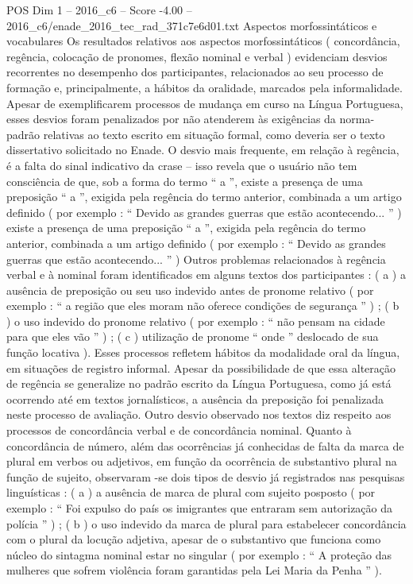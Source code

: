 \begin{textsample}{POS Dim 1 – 2016\_c6 – Score -4.00 – 2016\_c6/enade\_2016\_tec\_rad\_371c7e6d01.txt}
Aspectos morfossintáticos e vocabulares Os resultados relativos aos aspectos morfossintáticos ( concordância, regência, colocação de pronomes, flexão nominal e verbal ) evidenciam desvios recorrentes no desempenho dos participantes, relacionados ao seu processo de formação e, principalmente, a hábitos da oralidade, marcados pela informalidade.
Apesar de exemplificarem processos de mudança em curso na Língua Portuguesa, esses desvios foram penalizados por não atenderem às exigências da norma-padrão relativas ao texto escrito em situação formal, como deveria ser o texto dissertativo solicitado no Enade.
O desvio mais frequente, em relação à regência, é a falta do sinal indicativo da crase – isso revela que o usuário não tem consciência de que, sob a forma do termo “ a ”, existe a presença de uma preposição “ a ”, exigida pela regência do termo anterior, combinada a um artigo definido ( por exemplo : “ Devido as grandes guerras que estão acontecendo... ” ) existe a presença de uma preposição “ a ”, exigida pela regência do termo anterior, combinada a um artigo definido ( por exemplo : “ Devido as grandes guerras que estão acontecendo... ” ) Outros problemas relacionados à regência verbal e à nominal foram identificados em alguns textos dos participantes : ( a ) a ausência de preposição ou seu uso indevido antes de pronome relativo ( por exemplo : “ a região que eles moram não oferece condições de segurança ” ) ; ( b ) o uso indevido do pronome relativo ( por exemplo : “ não pensam na cidade para que eles vão ” ) ; ( c ) utilização de pronome “ onde ” deslocado de sua função locativa ).
Esses processos refletem hábitos da modalidade oral da língua, em situações de registro informal.
Apesar da possibilidade de que essa alteração de regência se generalize no padrão escrito da Língua Portuguesa, como já está ocorrendo até em textos jornalísticos, a ausência da preposição foi penalizada neste processo de avaliação.
Outro desvio observado nos textos diz respeito aos processos de concordância verbal e de concordância nominal.
Quanto à concordância de número, além das ocorrências já conhecidas de falta da marca de plural em verbos ou adjetivos, em função da ocorrência de substantivo plural na função de sujeito, observaram -se dois tipos de desvio já registrados nas pesquisas linguísticas : ( a ) a ausência de marca de plural com sujeito posposto ( por exemplo : “ Foi expulso do país os imigrantes que entraram sem autorização da polícia ” ) ; ( b ) o uso indevido da marca de plural para estabelecer concordância com o plural da locução adjetiva, apesar de o substantivo que funciona como núcleo do sintagma nominal estar no singular ( por exemplo : “ A proteção das mulheres que sofrem violência foram garantidas pela Lei Maria da Penha ” ).

\end{textsample}
